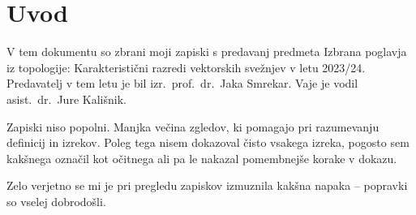 \section*{Uvod}

V tem dokumentu so zbrani moji zapiski s predavanj predmeta
Izbrana poglavja iz topologije: Karakteristični razredi vektorskih
svežnjev v letu 2023/24. Predavatelj v tem letu je bil
izr.~prof.~dr.~Jaka Smrekar. Vaje je vodil asist.~dr.~Jure Kališnik.

Zapiski niso popolni. Manjka večina zgledov, ki pomagajo pri
razumevanju definicij in izrekov. Poleg tega nisem dokazoval čisto
vsakega izreka, pogosto sem kakšnega označil kot očitnega ali pa le
nakazal pomembnejše korake v dokazu.

Zelo verjetno se mi je pri pregledu zapiskov izmuznila kakšna napaka
-- popravki so vselej dobrodošli.
